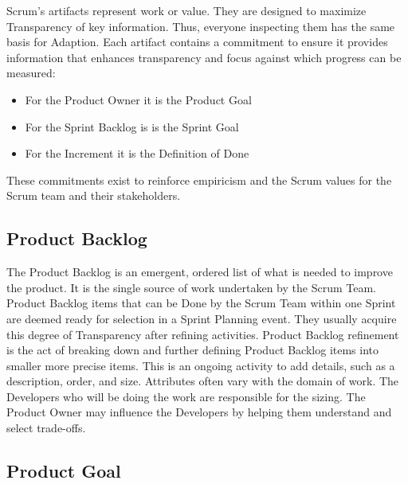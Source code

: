 \begin{flushleft}
	Scrum's artifacts represent work or value. They are designed to maximize Transparency
	of key information. Thus, everyone inspecting them has the same basis for Adaption.
	Each artifact contains a commitment to ensure it provides information that enhances
	transparency and focus against which progress can be measured:
\end{flushleft}

\begin{itemize}
	\item For the Product Owner it is the Product Goal
	\item For the Sprint Backlog is is the Sprint Goal
	\item For the Increment it is the Definition of Done
\end{itemize}

\begin{flushleft}
	These commitments exist to reinforce empiricism and the Scrum values for the Scrum
	team and their stakeholders.
\end{flushleft}

\subsection{Product Backlog}\label{scrum-product-backlog}

\begin{flushleft}
	The Product Backlog is an emergent, ordered list of what is needed to improve
	the product. It is the single source of work undertaken by the Scrum Team. Product
	Backlog items that can be Done by the Scrum Team within one Sprint are deemed
	ready for selection in a Sprint Planning event. They usually acquire this degree
	of Transparency after refining activities. Product Backlog refinement is the act
	of breaking down and further defining Product Backlog items into smaller more
	precise items. This is an ongoing activity to add details, such as a description,
	order, and size. Attributes often vary with the domain of work. The Developers who
	will be doing the work are responsible for the sizing. The Product Owner may influence
	the Developers by helping them understand and select trade-offs.
\end{flushleft}

\subsection{Product Goal}\label{scrum-product-goal}


